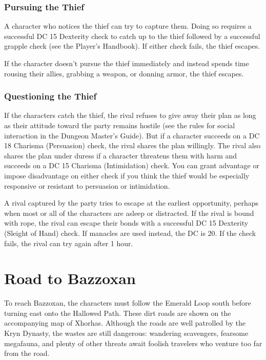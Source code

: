 \documentclass[10pt,a4paper,twoside,bg=print,twocolumn,openany,nodeprecatedcode]{dndbook}
\begin{document}
\subsubsection{Pursuing the Thief}
A character who notices the thief can try to capture them. Doing so requires a successful DC 15 Dexterity check to catch up to the thief followed by a successful grapple check (see the Player's Handbook). If either check fails, the thief escapes.

If the character doesn't pursue the thief immediately and instead spends time rousing their allies, grabbing a weapon, or donning armor, the thief escapes.

\subsubsection{Questioning the Thief}
If the characters catch the thief, the rival refuses to give away their plan as long as their attitude toward the party remains hostile (see the rules for social interaction in the Dungeon Master's Guide). But if a character succeeds on a DC 18 Charisma (Persuasion) check, the rival shares the plan willingly. The rival also shares the plan under duress if a character threatens them with harm and succeeds on a DC 15 Charisma (Intimidation) check. You can grant advantage or impose disadvantage on either check if you think the thief would be especially responsive or resistant to persuasion or intimidation.

A rival captured by the party tries to escape at the earliest opportunity, perhaps when most or all of the characters are asleep or distracted. If the rival is bound with rope, the rival can escape their bonds with a successful DC 15 Dexterity (Sleight of Hand) check. If manacles are used instead, the DC is 20. If the check fails, the rival can try again after 1 hour.

\section{Road to Bazzoxan}
To reach Bazzoxan, the characters must follow the Emerald Loop south before turning east onto the Hallowed Path. These dirt roads are shown on the accompanying map of Xhorhas. Although the roads are well patrolled by the Kryn Dynasty, the wastes are still dangerous: wandering scavengers, fearsome megafauna, and plenty of other threats await foolish travelers who venture too far from the road.
\end{document}
